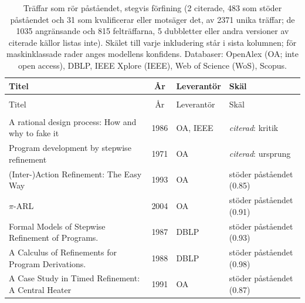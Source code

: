 
\begingroup\footnotesize
\begin{longtable}{@{}%
  >{\raggedright\arraybackslash}p{}c%
  >{\raggedright\arraybackslash}p{}%
  >{\raggedright\arraybackslash}p{}@{}}
\caption{Träffar som rör påståendet, stegvis förfining (2 citerade, 483 som stöder påståendet och 31 som kvalificerar eller motsäger det, av 2371 unika träffar; de 1035 angränsande och 815 felträffarna, 5 dubbletter eller andra versioner av citerade källor listas inte). Skälet till varje inkludering står i sista kolumnen; för maskinklassade rader anges modellens konfidens. Databaser: OpenAlex (OA; inte open access), DBLP, IEEE Xplore (IEEE), Web of Science (WoS), Scopus.}\label{tab:sok-stegvis}\\
\toprule
Titel & År & Leverantör & Skäl \\
\midrule
\endfirsthead
\multicolumn{4}{@{}l}{\emph{\tablename~\thetable{} (\GetTranslation{continued})}}\\
\toprule
Titel & År & Leverantör & Skäl \\
\midrule
\endhead
\midrule \multicolumn{4}{r@{}}{\emph{\GetTranslation{continued on the next page}}}\\
\endfoot
\bottomrule
\endlastfoot
A rational design process: How and why to fake it & 1986 & OA, IEEE & \emph{citerad}: kritik \\
Program development by stepwise refinement & 1971 & OA & \emph{citerad}: ursprung \\
(Inter-)Action Refinement: The Easy Way & 1993 & OA & stöder påståendet (0.85) \\
\ensuremath{\pi}-ARL & 2004 & OA & stöder påståendet (0.91) \\
\textquotedbl{}Formal Models of Stepwise Refinement of Programs\textquotedbl{}. & 1987 & DBLP & stöder påståendet (0.93) \\
A Calculus of Refinements for Program Derivations. & 1988 & DBLP & stöder påståendet (0.98) \\
A Case Study in Timed Refinement: A Central Heater & 1991 & OA & stöder påståendet (0.87) \\

\end{longtable}
